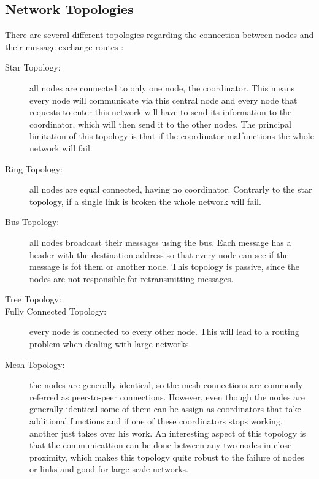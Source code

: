\subsection{Network Topologies}
There are several different topologies regarding the connection between nodes and their message
exchange routes \cite{Yadav2012, Lewis2004}:
\begin{description}
    \item[Star Topology:] all nodes are connected to only one node, the coordinator. This
        means every node will communicate via this central node and every node that requests
        to enter this network will have to send its information to the coordinator, which
        will then send it to the other nodes. The principal limitation of this topology is
        that if the coordinator malfunctions the whole network will fail.
    \item[Ring Topology:] all nodes are equal connected, having no coordinator. Contrarly
        to the star topology, if a single link is broken the whole network will fail.
    \item[Bus Topology:] all nodes broadcast their messages using the bus. Each message
        has a header with the destination address so that every node can see if the message
        is fot them or another node. This topology is passive, since the nodes are not
        responsible for retransmitting messages.
    \item[Tree Topology:] %
    \item[Fully Connected Topology:] every node is connected to every other node. This will
        lead to a routing problem when dealing with large networks.
    \item[Mesh Topology:] the nodes are generally identical, so the mesh connections are
        commonly referred as peer-to-peer connections. However, even though the nodes are
        generally identical some of them can be assign as coordinators that take additional
        functions and if one of these coordinators stops working, another just takes over his
        work. An interesting aspect of this topology is that the communicattion can be
        done between any two nodes in close proximity, which makes this topology quite
        robust to the failure of nodes or links and good for large scale networks.
\end{description}

